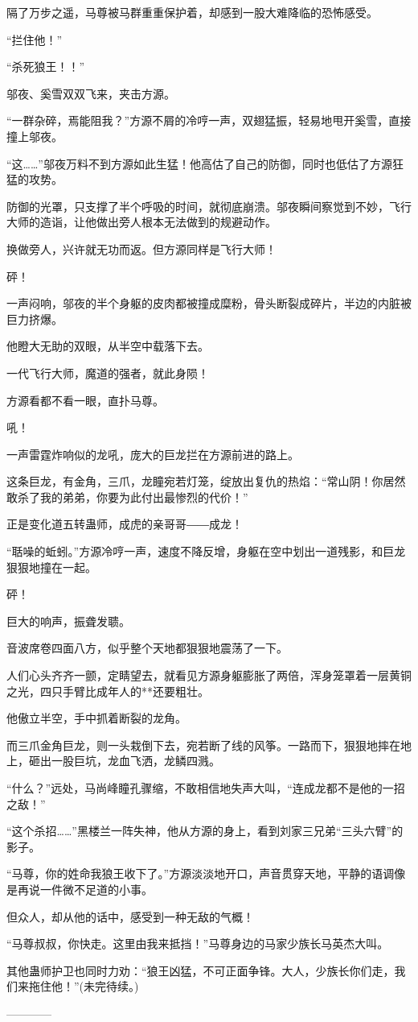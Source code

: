 \begin{this_body}
隔了万步之遥，马尊被马群重重保护着，却感到一股大难降临的恐怖感受。

“拦住他！”

“杀死狼王！！”

邬夜、奚雪双双飞来，夹击方源。

“一群杂碎，焉能阻我？”方源不屑的冷哼一声，双翅猛振，轻易地甩开奚雪，直接撞上邬夜。

“这……”邬夜万料不到方源如此生猛！他高估了自己的防御，同时也低估了方源狂猛的攻势。

防御的光罩，只支撑了半个呼吸的时间，就彻底崩溃。邬夜瞬间察觉到不妙，飞行大师的造诣，让他做出旁人根本无法做到的规避动作。

换做旁人，兴许就无功而返。但方源同样是飞行大师！

砰！

一声闷响，邬夜的半个身躯的皮肉都被撞成糜粉，骨头断裂成碎片，半边的内脏被巨力挤爆。

他瞪大无助的双眼，从半空中载落下去。

一代飞行大师，魔道的强者，就此身陨！

方源看都不看一眼，直扑马尊。

吼！

一声雷霆炸响似的龙吼，庞大的巨龙拦在方源前进的路上。

这条巨龙，有金角，三爪，龙瞳宛若灯笼，绽放出复仇的热焰：“常山阴！你居然敢杀了我的弟弟，你要为此付出最惨烈的代价！”

正是变化道五转蛊师，成虎的亲哥哥――成龙！

“聒噪的蚯蚓。”方源冷哼一声，速度不降反增，身躯在空中划出一道残影，和巨龙狠狠地撞在一起。

砰！

巨大的响声，振聋发聩。

音波席卷四面八方，似乎整个天地都狠狠地震荡了一下。

人们心头齐齐一颤，定睛望去，就看见方源身躯膨胀了两倍，浑身笼罩着一层黄铜之光，四只手臂比成年人的**还要粗壮。

他傲立半空，手中抓着断裂的龙角。

而三爪金角巨龙，则一头栽倒下去，宛若断了线的风筝。一路而下，狠狠地摔在地上，砸出一股巨坑，龙血飞洒，龙鳞四溅。

“什么？”远处，马尚峰瞳孔骤缩，不敢相信地失声大叫，“连成龙都不是他的一招之敌！”

“这个杀招……”黑楼兰一阵失神，他从方源的身上，看到刘家三兄弟“三头六臂”的影子。

“马尊，你的姓命我狼王收下了。”方源淡淡地开口，声音贯穿天地，平静的语调像是再说一件微不足道的小事。

但众人，却从他的话中，感受到一种无敌的气概！

“马尊叔叔，你快走。这里由我来抵挡！”马尊身边的马家少族长马英杰大叫。

其他蛊师护卫也同时力劝：“狼王凶猛，不可正面争锋。大人，少族长你们走，我们来拖住他！”(未完待续。)

------------

\end{this_body}

